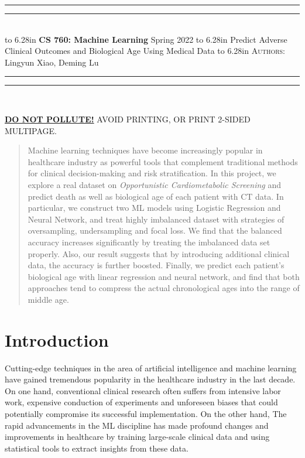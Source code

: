 \documentclass{article}
\newcommand{\lecture}[2]{
\pagestyle{myheadings}
\thispagestyle{plain}
\newpage
\noindent
\begin{center}
\rule{\textwidth}{1.6pt}\vspace*{-\baselineskip}\vspace*{2pt} %
\rule{\textwidth}{0.4pt}\\[1\baselineskip] %
\vbox{\vspace{2mm}
\hbox to 6.28in { {\bf CS 760: Machine Learning} \hfill Spring 2022 }
\vspace{4mm}
\hbox to 6.28in { {\Large \hfill #1  \hfill} }
\vspace{4mm}
\hbox to 6.28in { {\scshape Authors:}  #2 \hfill }}
\vspace{-2mm}
\rule{\textwidth}{0.4pt}\vspace*{-\baselineskip}\vspace{3.2pt} %
\rule{\textwidth}{1.6pt}\\[\baselineskip] %
\end{center}
\vspace*{4mm}
}
\begin{document}
\lecture{Predict Adverse Clinical Outcomes and Biological Age Using Medical Data
}{Lingyun Xiao, Deming Lu}

\begin{center}
{\Large {\sf \underline{\textbf{DO NOT POLLUTE!}} AVOID PRINTING, OR PRINT 2-SIDED MULTIPAGE.}}
\end{center}

\begin{abstract}
Machine learning techniques have become increasingly popular in healthcare industry as powerful tools that complement traditional methods for clinical decision-making and risk stratification. In this project, we explore a real dataset on \textit{Opportunistic Cardiometabolic Screening} and predict death as well as biological age of each patient with CT data. In particular, we construct two ML models using Logistic Regression and Neural Network, and treat highly imbalanced dataset with strategies of oversampling, undersampling and focal loss. We find that the balanced accuracy increases significantly by treating the imbalanced data set properly. Also, our result suggests that by introducing additional clinical data, the accuracy is further boosted. Finally, we predict each patient's biological age with linear regression and neural network, and find that both approaches tend to compress the actual chronological ages into the range of middle age.

\end{abstract}

\section{Introduction}

Cutting-edge techniques in the area of artificial intelligence and machine learning have gained tremendous popularity in the healthcare industry in the last decade. On one hand, conventional clinical research often suffers from intensive labor work, expensive conduction of experiments and unforeseen biases that could potentially compromise its successful implementation. On the other hand, The rapid advancements in the ML discipline has made profound changes and improvements in healthcare by training large-scale clinical data and using statistical tools to extract insights from these data. 
\end{document}

